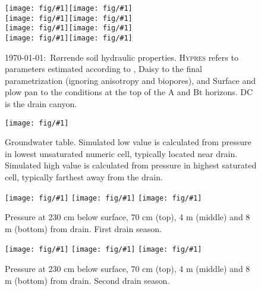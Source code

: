 \documentclass[a4paper]{article}
\newcommand{\figl}{\hspace*{-2cm}}
\newcommand{\figright}[1]{\texttt{[image: fig/\#1]}}
\newcommand{\fig}[1]{\figl\figright{#1}}
\newcommand{\figtop}[1]{\figl\texttt{[image: fig/\#1]}}
\newcommand{\Hypres}{\textsc{Hypres}}
\newcommand{\MyID}{\today:~}
\begin{document}
\begin{figure}[htbp] 
  \fig{Rorrende-Ap-Theta}\figright{Rorrende-Ap-K}\\
  \fig{Rorrende-Bt-Theta}\figright{Rorrende-Bt-K}\\
  \fig{Rorrende-C-Theta}\figright{Rorrende-C-K}\\
  \fig{Rorrende-DC-Theta}\figright{Rorrende-DC-K}
  \caption{\MyID{}R{\o}rrende soil hydraulic properties.  \Hypres{} refers to
    parameters estimated according to \citet{hypres}, Daisy to the
    final parametrization (ignoring anisotropy and biopores), and
    Surface and plow pan to the conditions at the top of the A and Bt
    horizons.  DC is the drain canyon.}
  \label{fig:Rorrende-hor}
\end{figure}

\begin{figure}[htbp]
  \begin{center}
    \fig{gwt}
  \end{center}
  \caption{Groundwater table.  Simulated low value is calculated from
    pressure in lowest unsaturated numeric cell, typically located
    near drain.  Simulated high value is calculated from pressure in
    highest saturated cell, typically farthest away from the drain.}
  \label{fig:gw}
\end{figure}


\begin{figure}[htbp]
  \begin{center}
    \figtop{piezo-70-9899}
    \fig{piezo-400-9899}
    \fig{piezo-800-9899}
  \end{center}
  \caption{Pressure at 230 cm below surface, 70 cm (top), 4 m (middle)
    and 8 m (bottom) from drain.  First drain season.}
  \label{fig:piezo-9899}
\end{figure}

\begin{figure}[htbp]
  \begin{center}
    \figtop{piezo-70-9900}
    \fig{piezo-400-9900}
    \fig{piezo-800-9900}
  \end{center}
  \caption{Pressure at 230 cm below surface, 70 cm (top), 4 m
    (middle) and 8 m (bottom) from drain.  Second drain season.}
  \label{fig:piezo-9900}
\end{figure}
\end{document}
